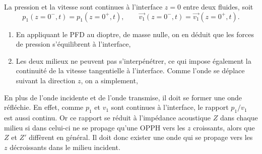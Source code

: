 \documentclass[12pt,fancy]{cours}%
\begin{document}
\begin{prop}\label{prop:}
La pression et la vitesse sont continues à l'interface $z=0$ entre deux fluides, soit
$$
p_1(z=0^-,t) = p_1(z=0^+,t), \qquad \Vec{v_1}(z=0^-,t) = \Vec{v_1}(z=0^+,t).
$$
\end{prop}

\begin{demo}
  \begin{enumerate}
    \item En appliquant le PFD au dioptre, de masse nulle, on en déduit que les forces de pression s'équilibrent à l'interface,
    \item Les deux milieux ne peuvent pas s'interpénétrer, ce qui impose également la continuité de la vitesse tangentielle à l'interface. Comme l'onde se déplace suivant la direction $z$, on a simplement,
  \end{enumerate}
\end{demo}

En plus de l'onde incidente et de l'onde transmise, il doit se former une onde réfléchie. En effet, comme $p_1$ et $v_1$ sont continues à l'interface, le rapport $p_1/v_1$ est aussi continu. Or ce rapport se réduit à l'impédance acoustique $Z$ dans chaque milieu si dans celui-ci ne se propage qu'une OPPH vers les $z$ croissants, alors que $Z$ et $Z'$ diffèrent en général. Il doit donc exister une onde qui se propage vers les $z$ décroissants dans le milieu incident.
\end{document}
